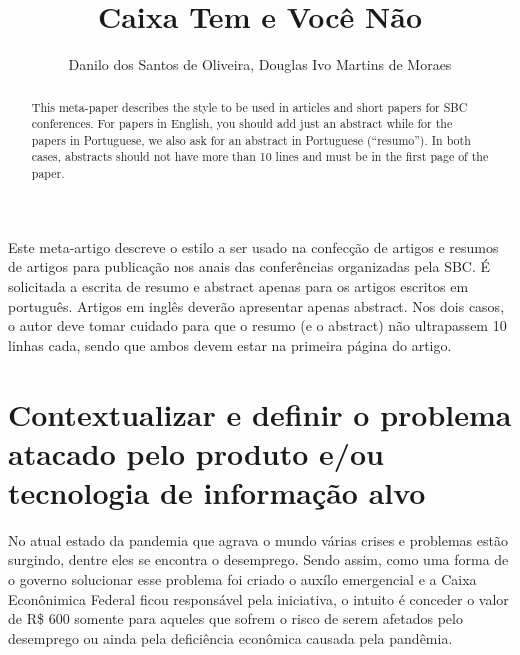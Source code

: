 \documentclass[12pt]{article}
\begin{document}
 
     
\sloppy

\title{Caixa Tem e Você Não}

\author{Danilo dos Santos de Oliveira, Douglas Ivo Martins de Moraes}

\maketitle



\begin{abstract}
  This meta-paper describes the style to be used in articles and short papers
  for SBC conferences. For papers in English, you should add just an abstract
  while for the papers in Portuguese, we also ask for an abstract in
  Portuguese (``resumo''). In both cases, abstracts should not have more than
  10 lines and must be in the first page of the paper.
\end{abstract}
     
\begin{resumo}
  Este meta-artigo descreve o estilo a ser usado na confecção de artigos e
  resumos de artigos para publicação nos anais das conferências organizadas
  pela SBC. É solicitada a escrita de resumo e abstract apenas para os artigos
  escritos em português. Artigos em inglês deverão apresentar apenas abstract.
  Nos dois casos, o autor deve tomar cuidado para que o resumo (e o abstract)
  não ultrapassem 10 linhas cada, sendo que ambos devem estar na primeira
  página do artigo.
\end{resumo}


\section{Contextualizar e definir o problema atacado pelo produto e/ou tecnologia de informação alvo} \label{sec:firstpage}

	No atual estado da pandemia que agrava o mundo várias crises e problemas estão surgindo, dentre eles se encontra o desemprego. Sendo assim, como uma forma de o governo solucionar esse problema foi criado o auxílo emergencial e a Caixa Econônimica Federal ficou responsável pela iniciativa, o intuito é conceder o valor de R\$ 600 somente para aqueles que sofrem o risco de serem afetados pelo desemprego ou ainda pela deficiência econômica causada pela pandêmia.
\end{document}
